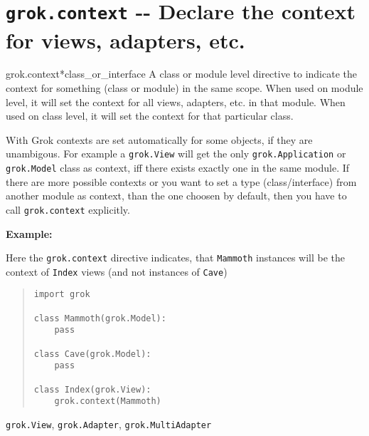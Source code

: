 \documentclass[10pt,a4paper,english]{manual}
\begin{document}
\section{\texttt{grok.context} -{}- Declare the context for views, adapters, etc.}
\begin{funcdesc}{grok.context}{*class{\_}or{\_}interface}
A class or module level directive to indicate the context for
something (class or module) in the same scope. When used on module
level, it will set the context for all views, adapters, etc. in
that module. When used on class level, it will set the context for
that particular class.

With Grok contexts are set automatically for some objects, if they
are unambigous. For example a \texttt{grok.View} will get the only
\texttt{grok.Application} or \texttt{grok.Model} class as context,
iff there exists exactly one in the same module. If there are more
possible contexts or you want to set a type (class/interface) from
another module as context, than the one choosen by default, then
you have to call \texttt{grok.context} explicitly.

\textbf{Example:}

Here the \texttt{grok.context} directive indicates, that
\texttt{Mammoth} instances will be the context of \texttt{Index}
views (and not instances of \texttt{Cave})
\begin{quote}\begin{verbatim}
import grok

class Mammoth(grok.Model):
    pass

class Cave(grok.Model):
    pass

class Index(grok.View):
    grok.context(Mammoth)
\end{verbatim}\end{quote}
\begin{seealso}

\texttt{grok.View}, \texttt{grok.Adapter}, \texttt{grok.MultiAdapter}
\end{seealso}

\end{funcdesc}


\end{document}
